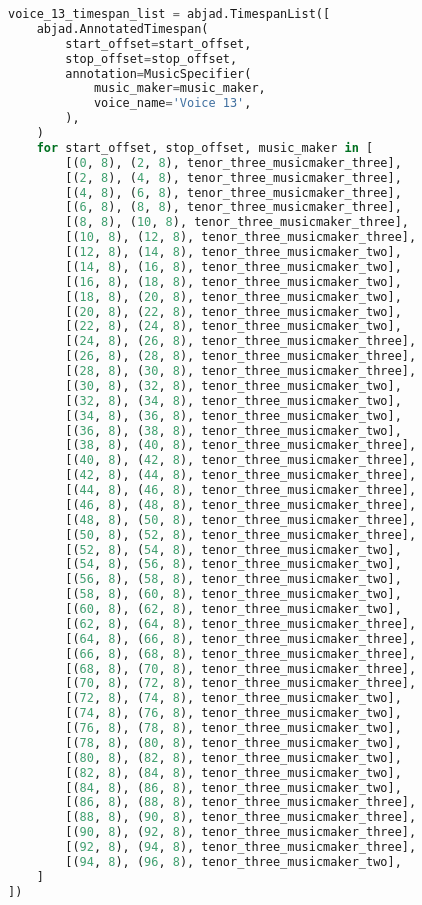 \begin{lstlisting}[language=Python, caption=Invocation Source Code]
voice_13_timespan_list = abjad.TimespanList([
    abjad.AnnotatedTimespan(
        start_offset=start_offset,
        stop_offset=stop_offset,
        annotation=MusicSpecifier(
            music_maker=music_maker,
            voice_name='Voice 13',
        ),
    )
    for start_offset, stop_offset, music_maker in [
        [(0, 8), (2, 8), tenor_three_musicmaker_three],
        [(2, 8), (4, 8), tenor_three_musicmaker_three],
        [(4, 8), (6, 8), tenor_three_musicmaker_three],
        [(6, 8), (8, 8), tenor_three_musicmaker_three],
        [(8, 8), (10, 8), tenor_three_musicmaker_three],
        [(10, 8), (12, 8), tenor_three_musicmaker_three],
        [(12, 8), (14, 8), tenor_three_musicmaker_two],
        [(14, 8), (16, 8), tenor_three_musicmaker_two],
        [(16, 8), (18, 8), tenor_three_musicmaker_two],
        [(18, 8), (20, 8), tenor_three_musicmaker_two],
        [(20, 8), (22, 8), tenor_three_musicmaker_two],
        [(22, 8), (24, 8), tenor_three_musicmaker_two],
        [(24, 8), (26, 8), tenor_three_musicmaker_three],
        [(26, 8), (28, 8), tenor_three_musicmaker_three],
        [(28, 8), (30, 8), tenor_three_musicmaker_three],
        [(30, 8), (32, 8), tenor_three_musicmaker_two],
        [(32, 8), (34, 8), tenor_three_musicmaker_two],
        [(34, 8), (36, 8), tenor_three_musicmaker_two],
        [(36, 8), (38, 8), tenor_three_musicmaker_two],
        [(38, 8), (40, 8), tenor_three_musicmaker_three],
        [(40, 8), (42, 8), tenor_three_musicmaker_three],
        [(42, 8), (44, 8), tenor_three_musicmaker_three],
        [(44, 8), (46, 8), tenor_three_musicmaker_three],
        [(46, 8), (48, 8), tenor_three_musicmaker_three],
        [(48, 8), (50, 8), tenor_three_musicmaker_three],
        [(50, 8), (52, 8), tenor_three_musicmaker_three],
        [(52, 8), (54, 8), tenor_three_musicmaker_two],
        [(54, 8), (56, 8), tenor_three_musicmaker_two],
        [(56, 8), (58, 8), tenor_three_musicmaker_two],
        [(58, 8), (60, 8), tenor_three_musicmaker_two],
        [(60, 8), (62, 8), tenor_three_musicmaker_two],
        [(62, 8), (64, 8), tenor_three_musicmaker_three],
        [(64, 8), (66, 8), tenor_three_musicmaker_three],
        [(66, 8), (68, 8), tenor_three_musicmaker_three],
        [(68, 8), (70, 8), tenor_three_musicmaker_three],
        [(70, 8), (72, 8), tenor_three_musicmaker_three],
        [(72, 8), (74, 8), tenor_three_musicmaker_two],
        [(74, 8), (76, 8), tenor_three_musicmaker_two],
        [(76, 8), (78, 8), tenor_three_musicmaker_two],
        [(78, 8), (80, 8), tenor_three_musicmaker_two],
        [(80, 8), (82, 8), tenor_three_musicmaker_two],
        [(82, 8), (84, 8), tenor_three_musicmaker_two],
        [(84, 8), (86, 8), tenor_three_musicmaker_two],
        [(86, 8), (88, 8), tenor_three_musicmaker_three],
        [(88, 8), (90, 8), tenor_three_musicmaker_three],
        [(90, 8), (92, 8), tenor_three_musicmaker_three],
        [(92, 8), (94, 8), tenor_three_musicmaker_three],
        [(94, 8), (96, 8), tenor_three_musicmaker_two],
    ]
])


\end{lstlisting}
